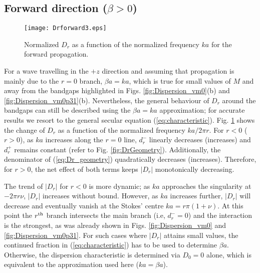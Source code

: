 \documentclass[journal]{IEEEtran}
\begin{document}
\subsection{Forward direction ($\beta>0$)} 
\begin{figure}
\centering
\texttt{[image: Drforward3.eps]}
\caption{Normalized $D_r$ as a function of the normalized frequency $ka$ for the forward propagation.}
\label{fig:Drforward}
\end{figure}
For a wave travelling in the $+z$ direction and assuming that propagation is mainly due to the $r=0$ branch, $\beta a=ka$, which is true for small values of $M$ and away from the bandgaps highlighted in Figs. \ref{fig:Dispersion_vm0}(b) and \ref{fig:Dispersion_vm0p31}(b). Nevertheless, the general behaviour of $D_r$ around the bandgaps can still be described using the $\beta a=ka$ approximation; for accurate results we resort to the general secular equation (\ref{eq:characteristic}). Fig. \ref{fig:Drforward} shows the change of $D_r$ as a function of the normalized frequency $ka/2\pi r$. For $r<0$ ($r>0$), as $ka$ increases along the $r=0$ line, $d_{r}^-$ linearly decreases (increases) and $d_{r}^+$ remains constant (refer to Fig. \ref{fig:DrGeometry}). Additionally, the denominator of (\ref{eq:Dr_geometry}) quadratically decreases (increases). Therefore, for $r>0$,  the net effect of both terms keeps $|D_r|$ monotonically decreasing.

The trend of $|D_r|$ for $ r<0$ is more dynamic; as $ka$ approaches the singularity at $-2\pi r\nu$, $|D_r|$ increases  without bound. However, as $ka$ increases further, $|D_r|$ will decrease and eventually vanish at the Stokes' centre $ka=r\pi(1+\nu)$. At this point the $r^\textnormal{th}$ branch intersects the main branch (i.e, $d_{r}^-=0$) and the interaction is the strongest, as was already shown in Figs. \ref{fig:Dispersion_vm0} and \ref{fig:Dispersion_vm0p31}. For such cases where $|D_r|$ attains small values, the continued fraction in (\ref{eq:characteristic}) has to be used to determine $\beta a$. Otherwise, the dispersion characteristic is determined via $D_0=0$ alone, which is equivalent to the approximation used here ($ka=\beta a$).
\end{document}
